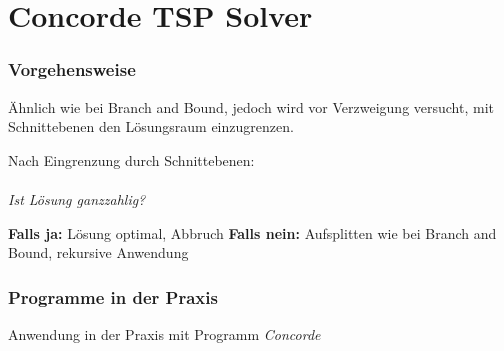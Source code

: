 \documentclass[handout]{beamer}
\begin{document}
  \section{Concorde TSP Solver}
  \begin{frame}
    \frametitle{Vorgehensweise}

    Ähnlich wie bei Branch and Bound, jedoch wird vor Verzweigung
    versucht, mit Schnittebenen den Lösungsraum einzugrenzen.

    \pause
    \vspace{1em}

    Nach Eingrenzung durch Schnittebenen: \\~\\
    \textit{Ist Lösung ganzzahlig?}

    \pause
    \vspace{1em}

    \textbf{Falls ja:} Lösung optimal, Abbruch
    \pause
    \textbf{Falls nein:} Aufsplitten wie bei Branch and Bound, rekursive Anwendung
  \end{frame}

  \begin{frame}
    \frametitle{Programme in der Praxis}
    Anwendung in der Praxis mit Programm \textit{Concorde}
  \end{frame}
\end{document}
